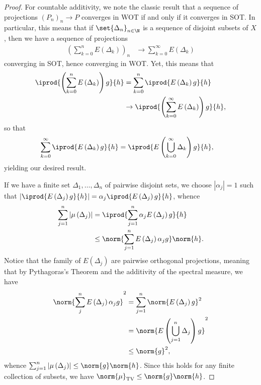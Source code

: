 \documentclass[10pt]{mypackage}
\begin{document}
\begin{proof}
  For countable additivity, we note the classic result that a sequence of projections $\left( P_n \right)_n\rightarrow P$ converges in WOT if and only if it converges in SOT. In particular, this means that if $\set{\Delta_n}_{n\in \N}$ is a sequence of disjoint subsets of $X$, then we have a sequence of projections
  \begin{align*}
    \left( \sum_{k=0}^{n}E\left( \Delta_k \right) \right)_{n} &\rightarrow \sum_{k=0}^{\infty} E\left( \Delta_k \right)
  \end{align*}
  converging in SOT, hence converging in WOT. Yet, this means that
  \begin{align*}
    \iprod{\left( \sum_{k=0}^{n}E\left( \Delta_k \right) \right)g}{h} &= \sum_{k=0}^{n} \iprod{E\left( \Delta_k \right)g}{h}\\
                                                                      &\rightarrow  \iprod{\left( \sum_{k=0}^{\infty}E\left( \Delta_k \right) \right)g}{h},
  \end{align*}
  so that
  \begin{align*}
    \sum_{k=0}^{\infty} \iprod{E\left( \Delta_k \right)g}{h} &= \iprod{E\left( \bigcup_{k=0}^{\infty}\Delta_k \right)g}{h},
  \end{align*}
  yielding our desired result.

  If we have a finite set $\Delta_1,\dots,\Delta_n$ of pairwise disjoint sets, we choose $\left\vert \alpha_j \right\vert = 1$ such that $ \left\vert \iprod{E\left( \Delta_j \right)g}{h} \right\vert = \alpha_j \iprod{E\left( \Delta_j \right)g}{h}$, whence
  \begin{align*}
    \sum_{j=1}^{n} \left\vert \mu\left( \Delta_j \right) \right\vert &= \iprod{\sum_{j=1}^{n}\alpha_j E\left( \Delta_j \right)g}{h}\\
                                                                     &\leq \norm{\sum_{j=1}^{n}E\left( \Delta_j \right)\alpha_j g}\norm{h}.
  \end{align*}
  Notice that the family of $E\left( \Delta_j \right)$ are pairwise orthogonal projections, meaning that by Pythagoras's Theorem and the additivity of the spectral measure, we have
  \begin{align*}
    \norm{\sum_{j}^{n}E\left( \Delta_j \right)\alpha_jg}^2 &= \sum_{j=1}^{n}\norm{E\left( \Delta_j \right)g}^2\\
                                                           &= \norm{E\left( \bigcup_{j=1}^{n}\Delta_j \right)g}^2\\
                                                           &\leq \norm{g}^2,
  \end{align*}
  whence $\sum_{j=1}^{n}\left\vert \mu\left( \Delta_j \right) \right\vert\leq \norm{g}\norm{h}$. Since this holds for any finite collection of subsets, we have $\norm{\mu}_{\operatorname{TV}}\leq \norm{g}\norm{h}$.
\end{proof}
\end{document}
